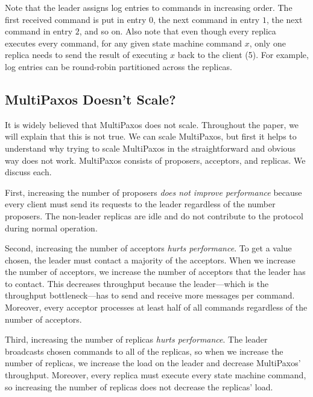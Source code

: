 Note that the leader assigns log entries to commands in increasing order. The
first received command is put in entry $0$, the next command in entry $1$, the
next command in entry $2$, and so on.
%
Also note that even though every replica executes every command, for any given
state machine command $x$, only one replica needs to send the result of
executing $x$ back to the client (5). For example, log entries can be
round-robin partitioned across the replicas.
%

\subsection{MultiPaxos Doesn't Scale?}
It is widely believed that MultiPaxos does not scale. Throughout the paper, we
will explain that this is not true. We can scale MultiPaxos, but first it helps
to understand why trying to scale MultiPaxos in the straightforward and obvious
way does not work. MultiPaxos consists of proposers, acceptors, and replicas.
We discuss each.

First, increasing the number of proposers \emph{does not improve performance}
because every client must send its requests to the leader regardless of the
number proposers. The non-leader replicas are idle and do not contribute to the
protocol during normal operation.

Second, increasing the number of acceptors \emph{hurts performance}. To get a
value chosen, the leader must contact a majority of the acceptors. When we
increase the number of acceptors, we increase the number of acceptors that the
leader has to contact. This decreases throughput because the leader---which is
the throughput bottleneck---has to send and receive more messages per command.
Moreover, every acceptor processes at least half of all commands regardless of
the number of acceptors.

Third, increasing the number of replicas \emph{hurts performance}. The leader
broadcasts chosen commands to all of the replicas, so when we increase the
number of replicas, we increase the load on the leader and decrease MultiPaxos'
throughput. Moreover, every replica must execute every state machine command,
so increasing the number of replicas does not decrease the replicas' load.
